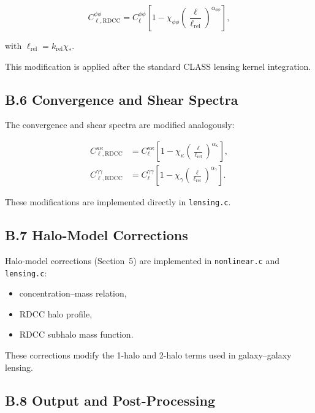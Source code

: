 \documentclass[11pt,a4paper]{article}
\begin{document}
\begin{equation}
C_{\ell,\mathrm{RDCC}}^{\phi\phi}
=
C_{\ell}^{\phi\phi}
\left[
1
-
\chi_{\phi\phi}
\left(
\frac{\ell}{\ell_{\mathrm{rel}}}
\right)^{\alpha_{\phi\phi}}
\right],
\end{equation}

with $\ell_{\mathrm{rel}} = k_{\mathrm{rel}}\chi_{*}$.

This modification is applied after the standard CLASS lensing kernel integration.

\subsection*{B.6 Convergence and Shear Spectra}

The convergence and shear spectra are modified analogously:

\begin{align}
C_{\ell,\mathrm{RDCC}}^{\kappa\kappa}
&=
C_{\ell}^{\kappa\kappa}
\left[
1
-
\chi_{\kappa}
\left(
\frac{\ell}{\ell_{\mathrm{rel}}}
\right)^{\alpha_{\kappa}}
\right], \\
C_{\ell,\mathrm{RDCC}}^{\gamma\gamma}
&=
C_{\ell}^{\gamma\gamma}
\left[
1
-
\chi_{\gamma}
\left(
\frac{\ell}{\ell_{\mathrm{rel}}}
\right)^{\alpha_{\gamma}}
\right].
\end{align}

These modifications are implemented directly in \texttt{lensing.c}.

\subsection*{B.7 Halo-Model Corrections}

Halo-model corrections (Section~5) are implemented in \texttt{nonlinear.c} and
\texttt{lensing.c}:

\begin{itemize}
\item concentration–mass relation,
\item RDCC halo profile,
\item RDCC subhalo mass function.
\end{itemize}

These corrections modify the 1-halo and 2-halo terms used in galaxy–galaxy lensing.

\subsection*{B.8 Output and Post-Processing}
\end{document}
